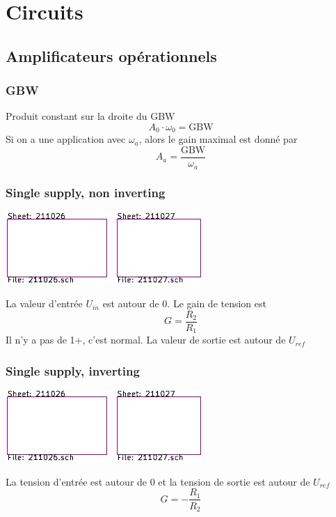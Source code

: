 \documentclass[]{article}
\begin{document}

\pagebreak
{}
\begin{multicols}{3}


\end{multicols}
\pagebreak
\begin{multicols}{3}

\pagebreak
\end{multicols}


\section{Circuits}
\subsection{Amplificateurs opérationnels}
\subsubsection{GBW}
Produit constant sur la droite du GBW
$$A_0\cdot \omega_0 = \text{GBW}$$
Si on a une application avec $\omega_a$, alors le gain maximal est donné par
$$A_a=\frac{\text{GBW}}{\omega_a}$$
\subsubsection{Single supply, non inverting}
\begin{center}
\includegraphics[width=0.7\columnwidth,page=3]{../KiCad/resume-crop.pdf}
\end{center}
La valeur d'entrée $U_{in}$ est autour de 0. Le gain de tension est
$$G=\frac{R_2}{R_1}$$
Il n'y a pas de 1+, c'est normal. La valeur de sortie est autour de $U_{ref}$
\subsubsection{Single supply, inverting}
\begin{center}
\includegraphics[width=0.7\columnwidth,page=4]{../KiCad/resume-crop.pdf}
\end{center}
La tension d'entrée est autour de 0 et la tension de sortie est autour de $U_{ref}$
$$G=-\frac{R_1}{R_2}$$
\end{document}
